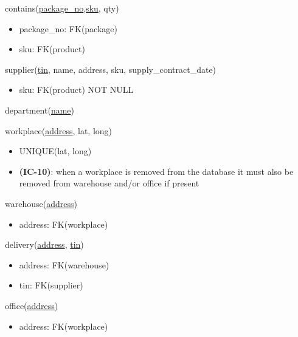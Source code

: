 \documentclass[12pt,a4paper]{article}
\begin{document}
  \vspace*{10pt}
  \noindent
  contains(\underline{package\_no},\underline{sku}, qty)
  \begin{itemize}[nosep]
      \item package\_no: FK(package)
      \item sku: FK(product)
  \end{itemize}

  \vspace*{10pt}
  \noindent
  supplier(\underline{tin}, name, address, sku, supply\_contract\_date)
  \begin{itemize}[nosep]
      \item sku: FK(product) NOT NULL
  \end{itemize}

  \vspace*{10pt}
  \noindent
  department(\underline{name})

  \vspace*{10pt}
  \noindent
  workplace(\underline{address}, lat, long)
  \begin{itemize}[nosep]
      \item UNIQUE(lat, long)
      \item \textsf{\textbf{(IC-10)}}: when a workplace \textsf{is removed} from the database it \textsf{must also} be removed from warehouse \textsf{and/or} office if present
  \end{itemize}

  \vspace*{10pt}
  \noindent
  warehouse(\underline{address})
  \begin{itemize}[nosep]
      \item address: FK(workplace)
  \end{itemize}

  \vspace*{10pt}
  \noindent
  delivery(\underline{address}, \underline{tin})
  \begin{itemize}[nosep]
      \item address: FK(warehouse)
      \item tin: FK(supplier)
  \end{itemize}

  \vspace*{10pt}
  \noindent
  office(\underline{address})
  \begin{itemize}[nosep]
      \item address: FK(workplace)
  \end{itemize}
\end{document}
